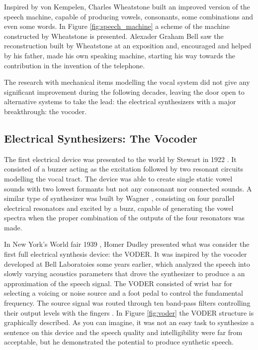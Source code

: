 Inspired by von Kempelen, Charles Wheatstone built an improved version of the speech machine, capable of producing vowels, consonants, some combinations and even some words. In Figure \ref{fig:speech_machine} a scheme of the machine constructed by Wheatstone is presented. Alexader Graham Bell saw the reconstruction built by Wheatstone at an exposition and, encouraged and helped by his father, made his own speaking machine, starting his way towards the contribution in the invention of the telephone.

The research with mechanical items modelling the vocal system did not give any significant improvement during the following decades, leaving the door open to alternative systems to take the lead: the electrical synthesizers with a major breakthrough: the vocoder.

\subsection{Electrical Synthesizers: The Vocoder}
\label{history_vocoder}
The first electrical device was presented to the world by Stewart in 1922 \cite{Klatt87}. It consisted of a buzzer acting as the excitation followed by two resonant circuits modelling the vocal tract. The device was able to create single static vowel sounds with two lowest formants but not any consonant nor connected sounds. A similar type of synthesizer was built by Wagner \cite{flanagan_book}, consisting on four parallel electrical resonators and excited by a buzz, capable of generating the vowel spectra when the proper combination of the outputs of the four resonators was made.

In New York's World fair 1939 \cite{flanagan_book, Klatt87, flanagan_1973_speech}, Homer Dudley presented what was consider the first full electrical synthesis device: the VODER. It was inspired by the vocoder developed at Bell Laboratoies some years earlier, which analyzed the speech into slowly varying acoustics parameters that drove the synthesizer to produce a an approximation of the speech signal. The VODER consisted of wrist bar for selecting a voicing or noise source and a foot pedal to control the fundamental frequency. The source signal was routed through ten band-pass filters controlling their output levels with the fingers \cite{LemmettyMSc}. In Figure \ref{fig:voder} the VODER structure is graphically described. As you can imagine, it was not an easy task to synthesize a sentence on this device and the speech quality and intelligibility were far from acceptable, but he demonstrated the potential to produce synthetic speech.

